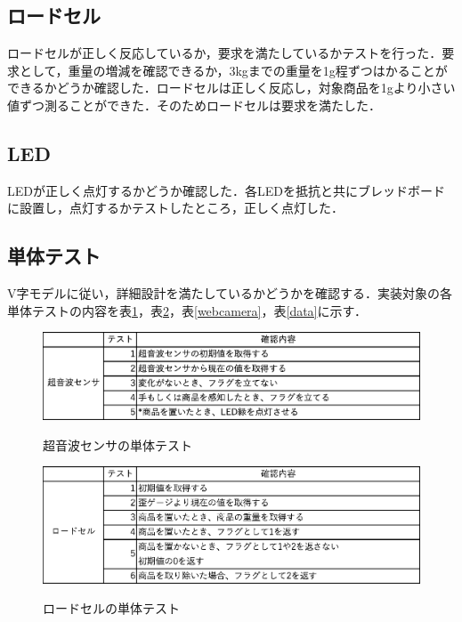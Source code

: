 \subsection*{ロードセル}

ロードセルが正しく反応しているか，要求を満たしているかテストを行った．要求として，重量の増減を確認できるか，3kgまでの重量を1g程ずつはかることができるかどうか確認した．ロードセルは正しく反応し，対象商品を1gより小さい値ずつ測ることができた．そのためロードセルは要求を満たした．

\subsection*{LED}

LEDが正しく点灯するかどうか確認した．各LEDを抵抗と共にブレッドボードに設置し，点灯するかテストしたところ，正しく点灯した．


\subsection{単体テスト}

V字モデルに従い，詳細設計を満たしているかどうかを確認する．実装対象の各単体テストの内容を表\ref{chouonpa}，表\ref{rodoseru}，表\ref{webcamera}，表\ref{data}に示す．


\begin{figure}[htbp]
\centering
\caption{超音波センサの単体テスト}
\includegraphics[width = 15cm]{./picture/chouonpa.eps}
\label{chouonpa}
\end{figure}

\begin{figure}[htbp]
\centering
\caption{ロードセルの単体テスト}
\includegraphics[width = 15cm]{./picture/rodoseru.eps}
\label{rodoseru}
\end{figure}

